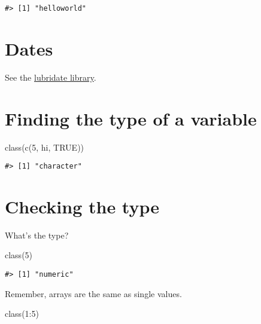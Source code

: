 \documentclass[
]{book}
\newenvironment{Shaded}{\begin{snugshade}}{\end{snugshade}}
\newcommand{\ConstantTok}[1]{\textcolor[rgb]{0.00,0.00,0.00}{#1}}
\newcommand{\DecValTok}[1]{\textcolor[rgb]{0.00,0.00,0.81}{#1}}
\newcommand{\FunctionTok}[1]{\textcolor[rgb]{0.00,0.00,0.00}{#1}}
\newcommand{\NormalTok}[1]{#1}
\newcommand{\SpecialCharTok}[1]{\textcolor[rgb]{0.00,0.00,0.00}{#1}}
\newcommand{\StringTok}[1]{\textcolor[rgb]{0.31,0.60,0.02}{#1}}
\begin{document}
\begin{verbatim}
#> [1] "helloworld"
\end{verbatim}

\hypertarget{dates}{%
\section{Dates}\label{dates}}

See the \href{https://lubridate.tidyverse.org/}{lubridate library}.

\hypertarget{finding-the-type-of-a-variable}{%
\section{Finding the type of a variable}\label{finding-the-type-of-a-variable}}

\begin{Shaded}
\begin{Highlighting}[]
\FunctionTok{class}\NormalTok{(}\FunctionTok{c}\NormalTok{(}\DecValTok{5}\NormalTok{, }\StringTok{\textquotesingle{}hi\textquotesingle{}}\NormalTok{, }\ConstantTok{TRUE}\NormalTok{))}
\end{Highlighting}
\end{Shaded}

\begin{verbatim}
#> [1] "character"
\end{verbatim}

\hypertarget{checking-the-type}{%
\section{Checking the type}\label{checking-the-type}}

What's the type?

\begin{Shaded}
\begin{Highlighting}[]
\FunctionTok{class}\NormalTok{(}\DecValTok{5}\NormalTok{)}
\end{Highlighting}
\end{Shaded}

\begin{verbatim}
#> [1] "numeric"
\end{verbatim}

Remember, arrays are the same as single values.

\begin{Shaded}
\begin{Highlighting}[]
\FunctionTok{class}\NormalTok{(}\DecValTok{1}\SpecialCharTok{:}\DecValTok{5}\NormalTok{)}
\end{Highlighting}
\end{Shaded}
\end{document}
